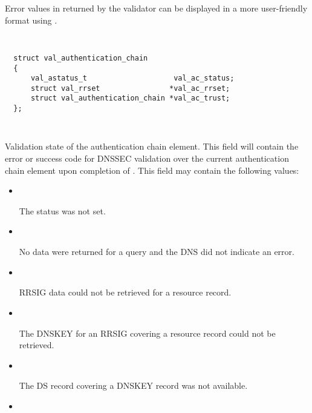 \begin{description}
\begin{description}
Error values in  returned by the validator can be displayed
in a more user-friendly format using .

\end{description}

\item {}\verb" "

\begin{verbatim}
  struct val_authentication_chain
  {
      val_astatus_t                    val_ac_status;
      struct val_rrset                *val_ac_rrset;
      struct val_authentication_chain *val_ac_trust;
  };
\end{verbatim}

\begin{description}

\item {}\verb" "

Validation state of the authentication chain element.  This field will contain
the error or success code for DNSSEC validation over the current authentication
chain element upon completion of .  This field
may contain the following values:

\begin{itemize}

\item {}\verb" "

The status was not set.

\item {}\verb" "

No data were returned for a query and the DNS did not indicate an error.

\item {}\verb" "

RRSIG data could not be retrieved for a resource record.

\item {}\verb" "

The DNSKEY for an RRSIG covering a resource record could not be retrieved.

\item {}\verb" "

The DS record covering a DNSKEY record was not available.

\item {}\verb" "


\end{itemize}
\end{description}
\end{description}
